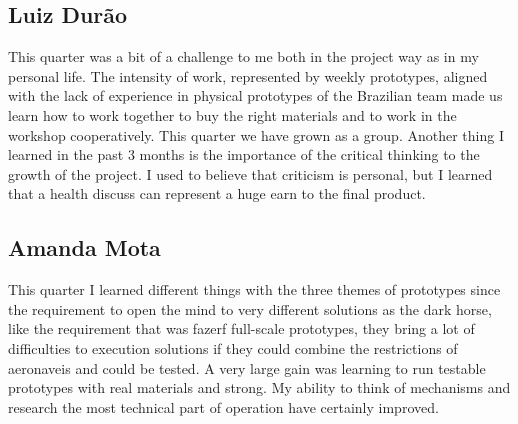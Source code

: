 \subsection{Luiz Durão}
This quarter was a bit of a challenge to me both in the project way as in my personal life. The intensity of work, represented by weekly prototypes, aligned with the lack of experience in physical prototypes of the Brazilian team made us learn how to work together to buy the right materials and to work in the workshop cooperatively. This quarter we have grown as a group. Another  thing I learned in the past 3 months is the importance of the critical thinking to the growth of the project. I used to believe that criticism is personal, but I learned that a health discuss can represent a huge earn to the final product. 

\subsection{Amanda Mota}

This quarter I learned different things with the three themes of prototypes since the requirement to open the mind to very different solutions as the dark horse, like the requirement that was fazerf full-scale prototypes, they bring a lot of difficulties to execution solutions if they could combine the restrictions of aeronaveis and could be tested. 
A very large gain was learning to run testable prototypes with real materials and strong. My ability to think of mechanisms and research the most technical part of operation have certainly improved.
